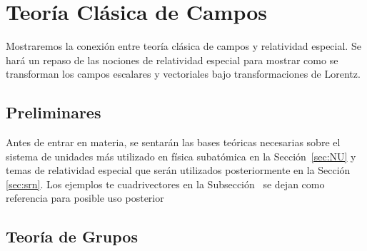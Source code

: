 \chapter{Teoría Clásica de Campos}
\label{chap:tcc} %
Mostraremos la conexión entre teoría clásica de campos y relatividad especial.
Se hará un repaso de las nociones de relatividad especial para mostrar como se transforman los campos escalares y vectoriales bajo transformaciones de Lorentz.

\section{Preliminares}
Antes de entrar en materia, se sentarán las bases teóricas necesarias sobre el sistema de unidades  más utilizado en física subatómica en la Sección~\ref{sec:NU} y temas de relatividad especial que serán utilizados posteriormente en la Sección \ref{sec:srn}. Los ejemplos te cuadrivectores en la Subsección~ se dejan como referencia para posible uso posterior

\section{Teoría de Grupos}

